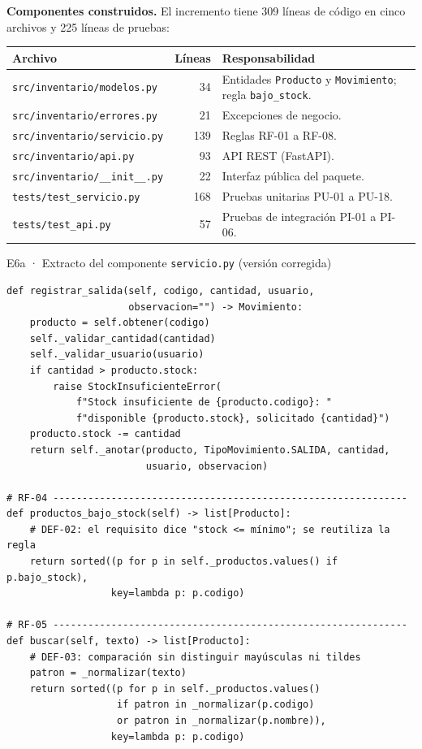 \documentclass[11pt,a4paper]{article}
\newcommand{\cod}[1]{\texttt{\small #1}}
\begin{document}
\noindent\textbf{Componentes construidos.} El incremento tiene 309 líneas de código en cinco archivos y 225 líneas de pruebas:

\begin{table}[H]
\centering\small
\begin{tabularx}{\linewidth}{@{}l r L@{}}
\toprule
\textbf{Archivo} & \textbf{Líneas} & \textbf{Responsabilidad} \\
\midrule
\cod{src/inventario/modelos.py}  & 34  & Entidades \cod{Producto} y \cod{Movimiento}; regla \cod{bajo\_stock}. \\
\cod{src/inventario/errores.py}  & 21  & Excepciones de negocio. \\
\cod{src/inventario/servicio.py} & 139 & Reglas RF-01 a RF-08. \\
\cod{src/inventario/api.py}      & 93  & API REST (FastAPI). \\
\cod{src/inventario/\_\_init\_\_.py} & 22 & Interfaz pública del paquete. \\
\cod{tests/test\_servicio.py}    & 168 & Pruebas unitarias PU-01 a PU-18. \\
\cod{tests/test\_api.py}         & 57  & Pruebas de integración PI-01 a PI-06. \\
\bottomrule
\end{tabularx}
\end{table}

\begin{evidencia}{E6a · Extracto del componente \cod{servicio.py} (versión corregida)}
\begin{lstlisting}[style=python]
def registrar_salida(self, codigo, cantidad, usuario,
                     observacion="") -> Movimiento:
    producto = self.obtener(codigo)
    self._validar_cantidad(cantidad)
    self._validar_usuario(usuario)
    if cantidad > producto.stock:
        raise StockInsuficienteError(
            f"Stock insuficiente de {producto.codigo}: "
            f"disponible {producto.stock}, solicitado {cantidad}")
    producto.stock -= cantidad
    return self._anotar(producto, TipoMovimiento.SALIDA, cantidad,
                        usuario, observacion)

# RF-04 -------------------------------------------------------------
def productos_bajo_stock(self) -> list[Producto]:
    # DEF-02: el requisito dice "stock <= mínimo"; se reutiliza la regla
    return sorted((p for p in self._productos.values() if p.bajo_stock),
                  key=lambda p: p.codigo)

# RF-05 -------------------------------------------------------------
def buscar(self, texto) -> list[Producto]:
    # DEF-03: comparación sin distinguir mayúsculas ni tildes
    patron = _normalizar(texto)
    return sorted((p for p in self._productos.values()
                   if patron in _normalizar(p.codigo)
                   or patron in _normalizar(p.nombre)),
                  key=lambda p: p.codigo)
\end{lstlisting}
\end{evidencia}
\end{document}
